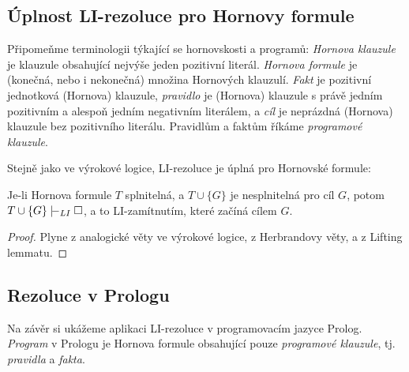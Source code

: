 \subsection{Úplnost LI-rezoluce pro Hornovy formule}

Připomeňme terminologii týkající se hornovskosti a programů: \emph{Hornova klauzule} je klauzule obsahující nejvýše jeden pozitivní literál. \emph{Hornova formule} je (konečná, nebo i nekonečná) množina Hornových klauzulí.
\emph{Fakt} je pozitivní jednotková (Hornova) klauzule, \emph{pravidlo} je (Hornova) klauzule s právě jedním pozitivním a alespoň jedním negativním literálem, a \emph{cíl} je neprázdná (Hornova) klauzule bez pozitivního literálu. Pravidlům a faktům říkáme \emph{programové klauzule}.

Stejně jako ve výrokové logice, LI-rezoluce je úplná pro Hornovské formule:

\begin{theorem}\label{theorem:completeness-of-li-resolution-for-horn-predicate}
Je-li Hornova formule $T$ splnitelná, a $T\cup\{G\}$ je nesplnitelná pro cíl $G$, potom $T\cup\{G\}\proves_{LI}\square$, a to LI-zamítnutím, které začíná cílem $G$.   
\end{theorem}
\begin{proof}
    Plyne z analogické věty ve výrokové logice, z Herbrandovy věty, a z Lifting lemmatu.
\end{proof}


\subsection{Rezoluce v Prologu}\label{subsection:resolution-in-prolog}


Na závěr si ukážeme aplikaci LI-rezoluce v programovacím jazyce Prolog. \emph{Program} v Prologu je Hornova formule obsahující pouze \emph{programové klauzule}, tj. \emph{pravidla} a \emph{fakta}.

